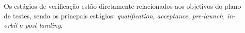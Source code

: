 
Os estágios de verificação estão diretamente relacionados aos objetivos do plano de testes, sendo os princpais estágios: \textit{qualification}, \textit{acceptance}, \textit{pre-launch}, \textit{in-orbit} e \textit{post-landing}.


